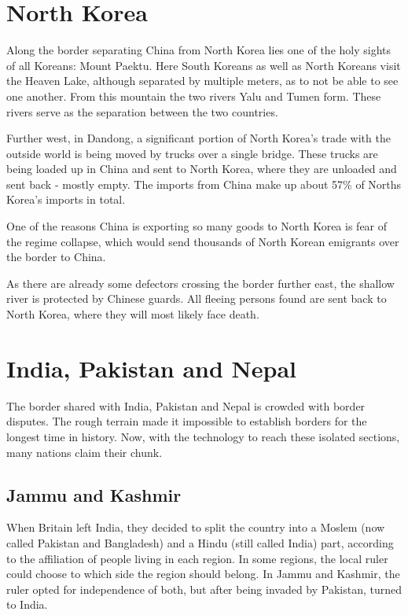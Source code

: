 \documentclass[conference]{IEEEtran}
\begin{document}
	\section{North Korea}
	Along the border separating China from North Korea lies one of the holy sights of all Koreans: Mount Paektu. \cite{theIndianExpress_explainedWhatIsTheSignificanceOfMtPeaktuForKinJongUn} Here South Koreans as well as North Koreans visit the Heaven Lake, although separated by multiple meters, as to not be able to see one another. From this mountain the two rivers Yalu and Tumen form. These rivers serve as the separation between the two countries.
	
	Further west, in Dandong, a significant portion of North Korea's trade with the outside world is being moved by trucks over a single bridge. These trucks are being loaded up in China and sent to North Korea, where they are unloaded and sent back - mostly empty. The imports from China make up about 57\%\cite{wp_economyOfNorthKorea} of Norths Korea's imports in total.
	
	One of the reasons China is exporting so many goods to North Korea is fear of the regime collapse, which would send thousands of North Korean emigrants over the border to China.
	
	As there are already some defectors crossing the border further east, the shallow river is protected by Chinese guards.\cite{yp_anInconvenientBorderWhereChinaMeetsNorthKoreaABCNews} All fleeing persons found are sent back to North Korea, where they will most likely face death.
	
	\section{India, Pakistan and Nepal}
	The border shared with India, Pakistan and Nepal is crowded with border disputes. The rough terrain made it impossible to establish borders for the longest time in history. Now, with the technology to reach these isolated sections, many nations claim their chunk.
	
	\subsection{Jammu and Kashmir}
	When Britain left India, they decided to split the country into a Moslem (now called Pakistan and Bangladesh) and a Hindu (still called India) part, according to the affiliation of people living in each region. In some regions, the local ruler could choose to which side the region should belong. In Jammu and Kashmir, the ruler opted for independence of both, but after being invaded by Pakistan, turned to India.
	
\end{document}
